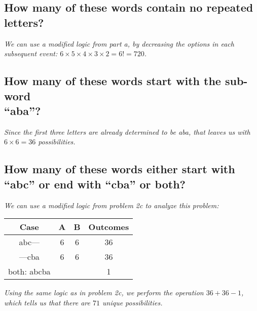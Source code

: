 \documentclass{article}
\begin{document}
\subsection{How many of these words contain no repeated letters?}
\hspace{1cm}\textit{We can use a modified logic from part a, by decreasing the options in each subsequent event:
    $6\times 5\times 4\times 3\times 2 = 6! = 720$.}
\subsection{How many of these words start with the sub-word \\ “aba”?}
\hspace{1cm}\textit{Since the first three letters are already determined to be aba, that leaves us with
    $6\times 6 = 36$ possibilities.}
\clearpage
\subsection{How many of these words either start with “abc” or end with “cba” or both?}
\hspace{1cm}\textit{We can use a modified logic from problem 2c to analyze this problem:}
\begin{center}
    \begin{tabular}{c|c|c|c}
        Case & A & B & Outcomes \\
        \hline
        abc--- & 6 & 6 & 36 \\
        \hline
        ---cba & 6 & 6 & 36 \\
        \hline
        both: abcba &  &  & 1 \\
        \hline
    \end{tabular}
\end{center}
\hspace{1cm}\textit{Using the same logic as in problem 2c, we perform the operation $36+36-1$,
    which tells us that there are $71$ unique possibilities.}
\end{document}

